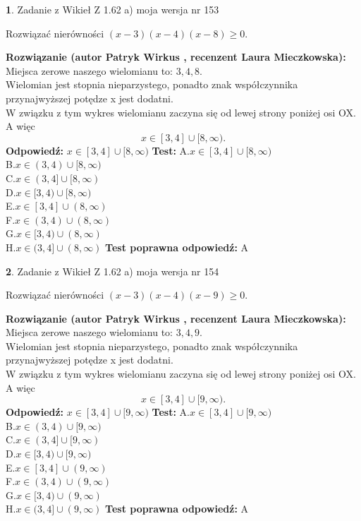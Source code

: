 \documentclass[12pt, a4paper]{article}
\theoremstyle{definition} %
\newtheorem{zad}{}
\newcommand{\zadStart}[1]{\begin{zad}#1\newline}
\newcommand{\zadStop}{\end{zad}}
\newcommand{\rozwStart}[2]{\noindent \textbf{Rozwiązanie (autor #1 , recenzent #2): }\newline}
\newcommand{\rozwStop}{\newline}
\newcommand{\odpStart}{\noindent \textbf{Odpowiedź:}\newline}
\newcommand{\odpStop}{\newline}
\newcommand{\testStart}{\noindent \textbf{Test:}\newline}
\newcommand{\testStop}{\newline}
\newcommand{\kluczStart}{\noindent \textbf{Test poprawna odpowiedź:}\newline}
\newcommand{\kluczStop}{\newline}
\begin{document}
\zadStart{Zadanie z Wikieł Z 1.62 a) moja wersja nr 153}

Rozwiązać nierówności $(x-3)(x-4)(x-8)\ge0$.
\zadStop
\rozwStart{Patryk Wirkus}{Laura Mieczkowska}
Miejsca zerowe naszego wielomianu to: $3, 4, 8$.\\
Wielomian jest stopnia nieparzystego, ponadto znak współczynnika przy\linebreak najwyższej potędze x jest dodatni.\\ W związku z tym wykres wielomianu zaczyna się od lewej strony poniżej osi OX. A więc $$x \in [3,4] \cup [8,\infty).$$
\rozwStop
\odpStart
$x \in [3,4] \cup [8,\infty)$
\odpStop
\testStart
A.$x \in [3,4] \cup [8,\infty)$\\
B.$x \in (3,4) \cup [8,\infty)$\\
C.$x \in (3,4] \cup [8,\infty)$\\
D.$x \in [3,4) \cup [8,\infty)$\\
E.$x \in [3,4] \cup (8,\infty)$\\
F.$x \in (3,4) \cup (8,\infty)$\\
G.$x \in [3,4) \cup (8,\infty)$\\
H.$x \in (3,4] \cup (8,\infty)$
\testStop
\kluczStart
A
\kluczStop



\zadStart{Zadanie z Wikieł Z 1.62 a) moja wersja nr 154}

Rozwiązać nierówności $(x-3)(x-4)(x-9)\ge0$.
\zadStop
\rozwStart{Patryk Wirkus}{Laura Mieczkowska}
Miejsca zerowe naszego wielomianu to: $3, 4, 9$.\\
Wielomian jest stopnia nieparzystego, ponadto znak współczynnika przy\linebreak najwyższej potędze x jest dodatni.\\ W związku z tym wykres wielomianu zaczyna się od lewej strony poniżej osi OX. A więc $$x \in [3,4] \cup [9,\infty).$$
\rozwStop
\odpStart
$x \in [3,4] \cup [9,\infty)$
\odpStop
\testStart
A.$x \in [3,4] \cup [9,\infty)$\\
B.$x \in (3,4) \cup [9,\infty)$\\
C.$x \in (3,4] \cup [9,\infty)$\\
D.$x \in [3,4) \cup [9,\infty)$\\
E.$x \in [3,4] \cup (9,\infty)$\\
F.$x \in (3,4) \cup (9,\infty)$\\
G.$x \in [3,4) \cup (9,\infty)$\\
H.$x \in (3,4] \cup (9,\infty)$
\testStop
\kluczStart
A
\kluczStop
\end{document}
